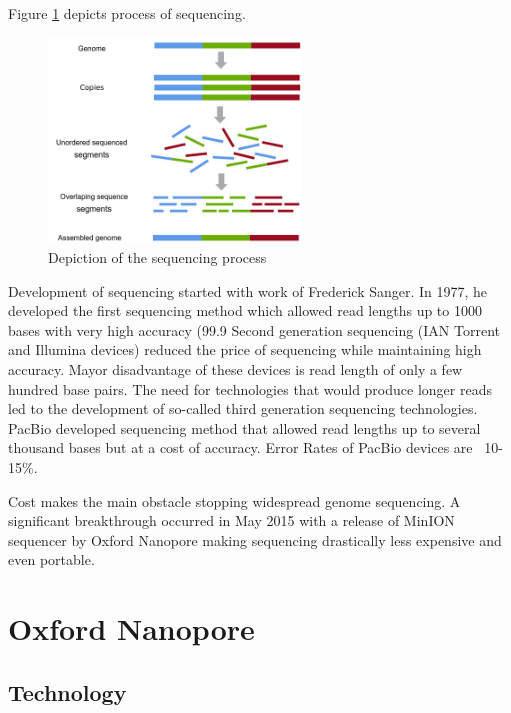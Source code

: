 \documentclass[times, utf8, diplomski, english]{fer}
\begin{document}
Figure \ref{fg:sequencing} depicts process of sequencing.

\begin{figure}[!ht]
	\begin{center}
		\includegraphics[width=0.6\textwidth]{./imgs/sequencing.png}
		\caption{Depiction of the sequencing process}
		\label{fg:sequencing}
	\end{center}
\end{figure}


Development of sequencing started with work of Frederick Sanger. In 1977, he developed the first sequencing method which allowed 
read lengths up to 1000 bases with very high accuracy (99.9%
Second generation sequencing (IAN Torrent and Illumina devices) reduced the price of sequencing while maintaining high accuracy. Mayor disadvantage of these devices is read length of only a few hundred base pairs.
The need for technologies that would produce longer reads led to the development of so-called third generation sequencing technologies.
PacBio developed sequencing method that allowed read lengths up to several thousand bases but at a cost of accuracy. Error Rates of PacBio devices are ~10-15\%. 

Cost makes the main obstacle stopping widespread genome sequencing.
A significant breakthrough occurred in May 2015 with a release of MinION sequencer by Oxford Nanopore making sequencing drastically less expensive and even portable.


\section{Oxford Nanopore}

\subsection{Technology}
\end{document}
